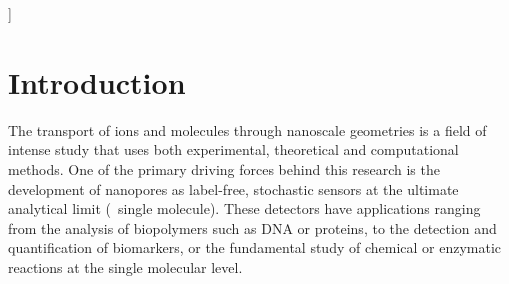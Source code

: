 \documentclass[twoside,twocolumn,9pt]{article}
\begin{document}
\begin{@twocolumnfalse}
\begin{tabular}{m{4.5cm} p{13.5cm} }
\end{tabular}

 \end{@twocolumnfalse} \vspace{0.6cm}

  ]

\renewcommand*\rmdefault{bch}\normalfont\upshape
\rmfamily
\section*{}
\vspace{-1cm}











\section{Introduction}

The transport of ions and molecules through nanoscale geometries is a field of intense study that uses both
experimental, theoretical and computational methods.\cite{Sparreboom-2010,Bocquet-2010,Maffeo-2012,
Thomas-2014,Wang-2014,Kim-2015} One of the primary driving forces behind this research is the development of
nanopores as label-free, stochastic sensors at the ultimate analytical limit (\ie{}~single molecule).
\cite{Bayley-2001,Dekker-2007,Venkatesan-2011,Zhang-2016} These detectors have applications ranging from the
analysis of biopolymers such as
DNA\cite{Deamer-2016,Kasianowicz-1996,Meller-2000,Maglia-2008,Butler-2008,Stoddart-2009,Franceschini-2013,Jain-2018}
or proteins,\cite{Restrepo-Perez-2018,Talaga-2009,Rodriguez-Larrea-2013, Nivala-2013,Kennedy-2016} to the
detection and quantification of
biomarkers,\cite{Chen-2013,Soskine-2012,Niedzwiecki-2013,VanMeervelt-2014,Huang-2017,Liu-2018,Galenkamp-2018}
or the fundamental study of chemical or enzymatic reactions at the single molecular
level.\cite{Willems-VanMeervelt-2017,Lieberman-2010, Nivala-2013,Ho-2015,Laszlo-2017}
\end{document}

